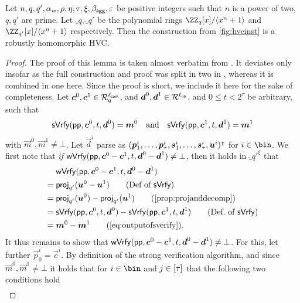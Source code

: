 \begin{lemma}\label{lem:hvcrobhom}
  Let $n,q,q',\alpha_w,\rho,\eta,\tau,\xi,\beta_{\mathsf{agg}},\varepsilon$ be positive integers such that $n$ is a power of two, $q,q'$ are prime.
  Let $\ring_q,\ring_{q'}$ be the polynomial rings $\ZZ_q[x]/\langle x^n+1\rangle$ and $\ZZ_{q'}[x]/\langle x^n+1\rangle$ respectively.
  Then the construction from \autoref{fig:hvcinst} is a robustly homomorphic HVC.
\end{lemma}
\begin{proof}
The proof of this lemma is taken almost verbatim from \cite{CCS:FleSimZha22}.
It deviates only insofar as the full construction and proof was split in two in \cite{CCS:FleSimZha22}, whereas it is combined in one here.
Since the proof is short, we include it here for the sake of completeness. %
Let $\boldsymbol{c}^0,\boldsymbol{c}^1 \in \mathcal{R}_q^{\ell_{\mathsf{com}}}$, and $\boldsymbol{d}^0, \boldsymbol{d}^1 \in \mathcal{R}^{\ell_{\mathsf{op}}}$, and $0\leq t <2^\tau$ be arbitrary, such that
\begin{equation}
    \mathsf{sVrfy}(\mathsf{pp},\boldsymbol{c}^0, t,\boldsymbol{d}^0)=\boldsymbol{m}^0 \quad \text{and} \quad \mathsf{sVrfy}(\mathsf{pp},\boldsymbol{c}^1, t,\boldsymbol{d}^1)=\boldsymbol{m}^1\label{eq:outputofsverify}
\end{equation}
with $\vec{m}^0,\vec{m}^1\neq \bot$.
Let $\vec{d}^i$ parse as $(\boldsymbol{p}^i_1,\dots,\boldsymbol{p}^i_{\tau},\boldsymbol{s}^i_1, \dots, \boldsymbol{s}^i_{\tau},\boldsymbol{u}^i)^\intercal$ for $i\in\bin$.
We first note that \emph{if} $\mathsf{wVrfy}(\mathsf{pp},\boldsymbol{c}^0-\boldsymbol{c}^1, t,\boldsymbol{d}^0-\boldsymbol{d}^1)\neq\bot$, then it holds in $\ring_{q'}^\xi$ that
\begin{align*}
  &\wverify(\params,\vec{c}^0-\vec{c}^1, t,\vec{d}^0-\vec{d}^1)\\
  ={}&\projmod{q'}(\vec{u}^0-\vec{u}^1)\tag{Def of $\sverify$}\\
  ={}&\projmod{q'}(\vec{u}^0)-\projmod{q'}(\vec{u}^1)\tag{\autoref{prop:projanddecomp}}\\
  ={}&\sverify(\params,\vec{c}^0, t,\vec{d}^0)-\sverify(\params,\vec{c}^1, t,\vec{d}^1)\tag{Def.\ of $\sverify$}\\
  ={}&\vec{m}^0- \vec{m}^1 \tag{\autoref{eq:outputofsverify}}.
\end{align*}
%
It thus remains to show that $\mathsf{wVrfy}(\mathsf{pp},\boldsymbol{c}^0-\boldsymbol{c}^1, t,\boldsymbol{d}^0-\boldsymbol{d}^1)\neq\bot$.
For this, let further $\vec{p}^i_0 = \vec{c}^i$.
By definition of the strong verification algorithm, and since $\vec{m}^0,\vec{m}^1\neq\bot$ it holds that for $i\in\bin$ 
and $j \in [\tau]$ that the following two conditions hold
\begin{align}

\end{align}
\end{proof}
